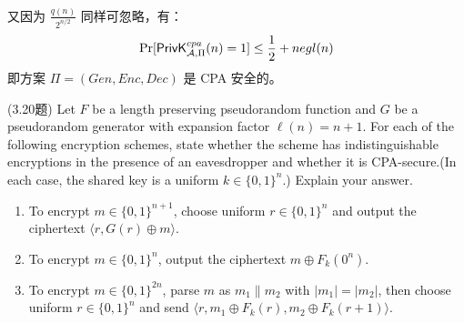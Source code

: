 \begin{questions}
\begin{solution}
\begin{equation}
\begin{aligned}
                \end{aligned}
            \end{equation}
            又因为 $\frac{q(n)}{2^{n/2}}$ 同样可忽略，有：
            \begin{equation}
                \begin{aligned}
                   \Pr[\mathsf{PrivK}^{cpa}_{\mathcal{A},\Pi}(n)=1]\leq\frac{1}{2}+negl(n)
                \end{aligned}
            \end{equation}
            即方案 $\Pi=(Gen,Enc,Dec)$ 是 CPA 安全的。
        \end{solution}

    \question(3.20题) Let $F$ be a length preserving pseudorandom function and $G$ be a pseudorandom generator with expansion factor $\ell(n)=n+1$. For each of the following encryption schemes, state whether the scheme has indistinguishable encryptions in the presence of an eavesdropper and whether it is CPA-secure.(In each case, the shared key is a uniform $k\in\{0,1\}^n$.) Explain your answer.

        \begin{enumerate}
            \item To encrypt $m\in\{0,1\}^{n+1}$, choose uniform $r\in\{0,1\}^n$ and output the ciphertext $\langle{r,G(r)\oplus{m}}\rangle$.
            \item To encrypt $m\in\{0,1\}^n$, output the ciphertext $m\oplus{F_k}(0^n)$.
            \item To encrypt $m\in\{0,1\}^{2n}$, parse $m$ as $\scriptstyle{m_1}\parallel{m_2}$ with $|m_1|=|m_2|$, then choose uniform $r\in\{0,1\}^n$ and send $\langle{r,m_1\oplus{F_k(r)},m_2\oplus{F_k(r+1)}}\rangle$.
        \end{enumerate}


\end{questions}
